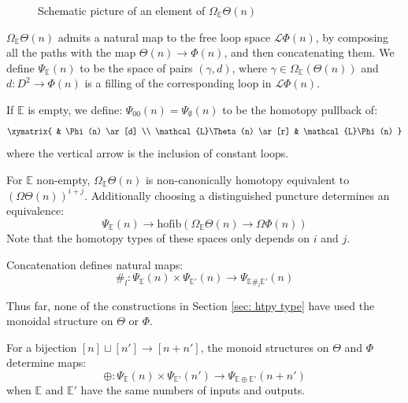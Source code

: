 \documentclass{TPmod}
\newcommand{\hofib}{\mathrm{hofib}}
\def\bE{\mathbb{E}}
\newcommand{\cL}{\mathcal{L}}
\numberwithin{equation}{section}
\begin{document}
\begin{defn}
\begin{figure}[ht]
\begin{center}
\end{center}
\caption{Schematic picture of an element of $\Omega_\bE \Theta(n)$
          \label{fig: qqq}}
\end{figure}


        $\Omega_\bE \Theta(n)$ admits a natural map to the free loop space $\cL \Phi(n)$, by composing all the paths with the map $\Theta(n) \to \Phi(n)$, and then concatenating them. We define $\Psi_\bE(n)$ to be the space of pairs $(\gamma, d)$, where $\gamma \in \Omega_\bE(\Theta(n))$ and $d: D^2 \to \Phi(n)$ is a filling of the corresponding loop in $\cL \Phi(n)$.
        
        If $\bE$ is empty, we define: $\Psi_{00}(n) = \Psi_{\emptyset}(n)$ to be the homotopy pullback of:
        \begin{equation}
            \xymatrix{
                &
                \Phi(n)
                \ar[d]
                \\
                \cL \Theta(n)
                \ar[r]
                &
                \cL \Phi(n)
            }
        \end{equation}  
        where the vertical arrow is the inclusion of constant loops.
    \end{defn}
    \begin{rmk}
        For $\bE$ non-empty, $\Omega_\bE \Theta(n)$ is non-canonically homotopy equivalent to $(\Omega \Theta(n))^{i+j}$. Additionally choosing a distinguished puncture determines an equivalence:
        \begin{equation}
            \Psi_\bE(n) \to \hofib(\Omega_\bE \Theta(n) \to \Omega \Phi(n))
        \end{equation}
        Note that the homotopy types of these spaces only depends on $i$ and $j$.
    \end{rmk}
    Concatenation defines natural maps:
    \begin{equation}
        \#_l: \Psi_\bE(n) \times \Psi_{\bE'}(n) \to \Psi_{\bE \#_l \bE'}(n)
    \end{equation}
    \begin{rmk}
        Thus far, none of the constructions in Section \ref{sec: htpy type} have used the monoidal structure on $\Theta$ or $\Phi$.
    \end{rmk}
    For a bijection $[n] \sqcup [n'] \to [n+n']$, the monoid structures on $\Theta$ and $\Phi$ determine maps:
    \begin{equation}
        \oplus: \Psi_{\bE}(n) \times \Psi_{\bE'}(n') \to \Psi_{\bE \oplus \bE'}(n+n')
    \end{equation}
    when $\bE$ and $\bE'$ have the same numbers of inputs and outputs.
\end{document}
